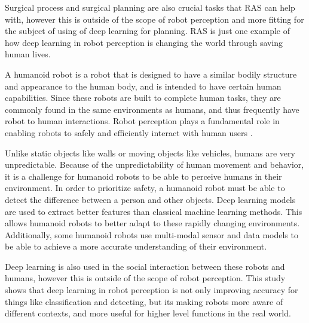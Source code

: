 \documentclass[conference]{IEEEtran}
\begin{document}
\par
Surgical process and surgical planning are also crucial tasks that RAS can help with, however this is outside of the scope of robot perception and more fitting for the subject of using of deep learning for planning. RAS is just one example of how deep learning in robot perception is changing the world through saving human lives.
\par
A humanoid robot is a robot that is designed to have a similar bodily structure and appearance to the human body, and is intended to have certain human capabilities. Since these robots are built to complete human tasks, they are commonly found in the same environments as humans, and thus frequently have robot to human interactions. Robot perception plays a fundamental role in enabling robots to safely and efficiently interact with human users \cite{roychoudhury2023}.
\par
Unlike static objects like walls or moving objects like vehicles, humans are very unpredictable. Because of the unpredictability of human movement and behavior, it is a challenge for humanoid robots to be able to perceive humans in their environment. In order to prioritize safety, a humanoid robot must be able to detect the difference between a person and other objects. Deep learning models are used to extract better features than classical machine learning methods. This allows humanoid robots to better adapt to these rapidly changing environments. Additionally, some humanoid robots use multi-modal sensor and data models to be able to achieve a more accurate understanding of their environment.
\par
Deep learning is also used in the social interaction between these robots and humans, however this is outside of the scope of robot perception. This study shows that deep learning in robot perception is not only improving accuracy for things like classification and detecting, but its making robots more aware of different contexts, and more useful for higher level functions in the real world.
\end{document}
